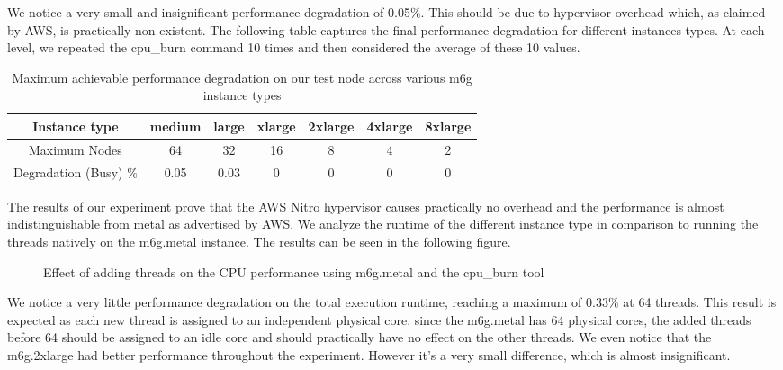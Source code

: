 \noindent
We notice a very small and insignificant performance  degradation of 0.05\%. This should be due 
to hypervisor overhead which, as claimed by AWS, is practically non-existent. 
The following table captures the final performance degradation for different instances types. 
At each level, we repeated the cpu\_burn command 10 times and then considered the average of these 10 values. 
\begin{table}[H]
\begin{center}
\begin{tabular}{ c|c|c|c|c|c|c }
 Instance type & medium & large & xlarge & 2xlarge & 4xlarge  & 8xlarge  \\
 \hline
 Maximum Nodes & 64 & 32 & 16 & 8 & 4 & 2 \\
\hline
Degradation (Busy) \%& 0.05 & 0.03 & 0 & 0 & 0 & 0  \\
\end{tabular}
\end{center}
\caption{Maximum achievable performance degradation on our test node across various m6g instance types}
\end{table}
\noindent
The results of our experiment prove that the AWS Nitro hypervisor causes practically no overhead and 
the performance is almost indistinguishable from metal as advertised by AWS. We analyze the runtime of 
the different instance type in comparison to running the threads natively on the m6g.metal instance. 
The results can be seen in the following figure. 
\begin{figure}[H]
\centering
{}
\caption{Effect of adding threads on the CPU performance using m6g.metal and the cpu\_burn tool}
\end{figure}
\noindent
We notice a very little performance degradation on the total execution runtime, reaching a maximum 
of 0.33\% at 64 threads. This result is expected as each new thread is assigned to an independent 
physical core. since the m6g.metal has 64 physical cores, the added threads before 64 should be 
assigned to an idle core and should practically have no effect on the other threads. We even notice 
that the m6g.2xlarge had better performance throughout the experiment. However it's a very 
small difference, which is almost insignificant. 